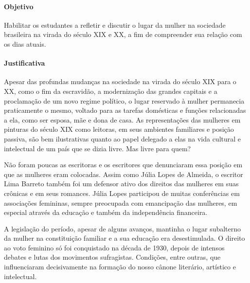 \documentclass[12pt]{extarticle}
\begin{document}
\paragraph{Objetivo} Habilitar os estudantes a refletir e discutir o lugar
da mulher na sociedade brasileira na virada do século XIX e XX, a fim de
compreender sua relação com os dias atuais.

\paragraph{Justificativa} Apesar das profundas mudanças na sociedade na
virada do século XIX para o XX, como o fim da escravidão, a modernização
das grandes capitais e a proclamação de um novo regime político, o lugar
reservado à mulher permanecia praticamente o mesmo, voltado para as
tarefas domésticas e funções relacionadas a ela, como ser esposa, mãe e
dona de casa. As representações das mulheres em pinturas do século XIX
como leitoras, em seus ambientes familiares e posição passiva, são bem
ilustrativas quanto ao papel delegado a elas na vida cultural e
intelectual de um país que se dizia livre. Mas livre para quem?





Não foram poucas as escritoras e os escritores que denunciaram essa
posição em que as mulheres eram colocadas. Assim como Júlia Lopes de
Almeida, o escritor Lima Barreto também foi um defensor ativo dos
direitos das mulheres em suas crônicas e em seus romances. Júlia Lopes
participou de muitas conferências em associações femininas, sempre
preocupada com emancipação das mulheres, em especial através da educação
e também da independência financeira.


A legislação do período, apesar de
alguns avanços, mantinha o lugar subalterno da mulher na constituição
familiar e a sua educação era desestimulada. O direito ao voto feminino
só foi conquistado na década de 1930, depois de intensos debates e lutas
dos movimentos sufragistas. Condições, entre outras, que influenciaram
decisivamente na formação do nosso cânone literário, artístico e
intelectual.


\end{document}
